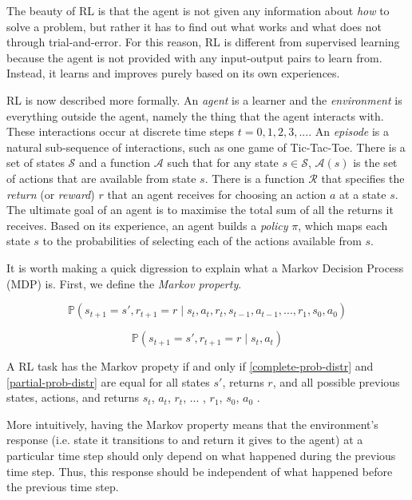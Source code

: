 \documentclass[11pt,a4paper]{report}
\begin{document}
The beauty of RL is that the agent is not given any information about \emph{how} to solve a problem, but rather it has to find out what works and what does not through trial-and-error. For this reason, RL is different from supervised learning because the agent is not provided with any input-output pairs to learn from. Instead, it learns and improves purely based on its own experiences.

RL is now described more formally. An \emph{agent} is a learner and the \emph{environment} is everything outside the agent, namely the thing that the agent interacts with. These interactions occur at discrete time steps $t = 0, 1, 2, 3, ...$. An \emph{episode} is a natural sub-sequence of interactions, such as one game of Tic-Tac-Toe. There is a set of states $\mathcal{S}$ and a function $\mathcal{A}$ such that for any state $s \in \mathcal{S}$, $\mathcal{A}(s)$ is the set of actions that are available from state $s$. There is a function $\mathcal{R}$ that specifies the \emph{return} (or \emph{reward}) $r$ that an agent receives for choosing an action $a$ at a state $s$. The ultimate goal of an agent is to maximise the total sum of all the returns it receives. Based on its experience, an agent builds a \emph{policy} $\pi$, which maps each state $s$ to the probabilities of selecting each of the actions available from $s$.

It is worth making a quick digression to explain what a Markov Decision Process (MDP) is. First, we define the \emph{Markov property}.

\begin{equation}
	\mathbb{P}(s_{t+1} = s', r_{t+1} = r \mid s_t, a_t, r_t, s_{t-1}, a_{t-1}, ... , r_1, s_0, a_0)
 \label{complete-prob-distr}
\end{equation}

\begin{equation}
	\mathbb{P}(s_{t+1} = s', r_{t+1} = r \mid s_t, a_t) \label{partial-prob-distr}
\end{equation}

A RL task has the Markov propety if and only if \ref{complete-prob-distr} and \ref{partial-prob-distr} are equal for all states $s'$, returns $r$, and all possible previous states, actions, and returns $s_t$, $a_t$, $r_t$, ... , $r_1$, $s_0$, $a_0$ \cite{rl-book}.

More intuitively, having the Markov property means that the environment's response (i.e. state it transitions to and return it gives to the agent) at a particular time step should only depend on what happened during the previous time step. Thus, this response should be independent of what happened before the previous time step.
\end{document}
